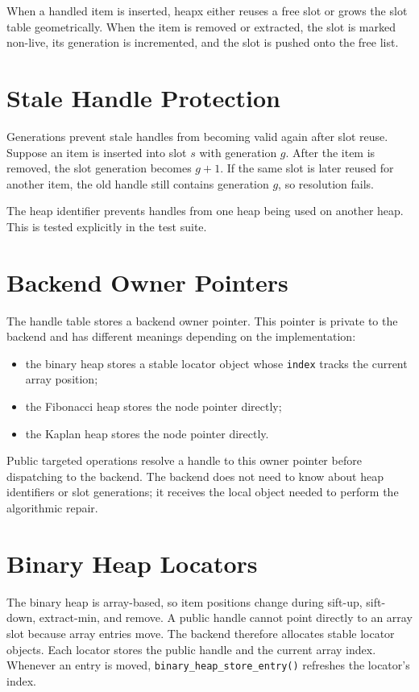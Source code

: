 When a handled item is inserted, heapx either reuses a free slot or grows the slot table geometrically.
When the item is removed or extracted, the slot is marked non-live, its generation is incremented, and the slot is pushed onto the free list.

\section{Stale Handle Protection}

Generations prevent stale handles from becoming valid again after slot reuse.
Suppose an item is inserted into slot $s$ with generation $g$.
After the item is removed, the slot generation becomes $g + 1$.
If the same slot is later reused for another item, the old handle still contains generation $g$, so resolution fails.

The heap identifier prevents handles from one heap being used on another heap.
This is tested explicitly in the test suite.

\section{Backend Owner Pointers}

The handle table stores a backend owner pointer.
This pointer is private to the backend and has different meanings depending on the implementation:

\begin{itemize}
    \item the binary heap stores a stable locator object whose \texttt{index} tracks the current array position;
    \item the Fibonacci heap stores the node pointer directly;
    \item the Kaplan heap stores the node pointer directly.
\end{itemize}

Public targeted operations resolve a handle to this owner pointer before dispatching to the backend.
The backend does not need to know about heap identifiers or slot generations; it receives the local object needed to perform the algorithmic repair.

\section{Binary Heap Locators}

The binary heap is array-based, so item positions change during sift-up, sift-down, extract-min, and remove.
A public handle cannot point directly to an array slot because array entries move.
The backend therefore allocates stable locator objects.
Each locator stores the public handle and the current array index.
Whenever an entry is moved, \texttt{binary\_heap\_store\_entry()} refreshes the locator's index.

